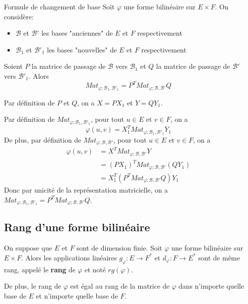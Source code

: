 \documentclass[a4paper,12pt]{article}
\begin{document}
\begin{theoreme}{Formule de changement de base}{}
    Soit $\varphi$ une forme bilinéaire sur $E \times F$.
    On considère:
    \begin{itemize}
        \item $\mathscr{B}$ et $\mathscr{B'}$ les bases "anciennes" de $E$ et $F$ respectivement
        \item $\mathscr{B}_1$ et $\mathscr{B'}_1$ les bases "nouvelles" de $E$ et $F$ respectivement
    \end{itemize}
    Soient $P$ la matrice de passage de $\mathscr{B}$ vers $\mathscr{B}_1$ et $Q$ la matrice de passage de $\mathscr{B'}$ vers $\mathscr{B'}_1$. Alors
    $$
    Mat_{\varphi; \mathscr{B}_1, \mathscr{B'}_1} = P^T Mat_{\varphi; \mathscr{B}, \mathscr{B'}} Q
    $$
\end{theoreme}

\begin{demonstration}
    Par définition de $P$ et $Q$, on a $X = P X_1$ et $Y = Q Y_1$.

    Par définition de $Mat_{\varphi; \mathscr{B}_1, \mathscr{B'}_1}$, pour tout $u \in E$ et $v \in F$, on a
    $$
    \varphi(u, v) = X_1^T Mat_{\varphi; \mathscr{B}_1, \mathscr{B'}_1} Y_1
    $$
    De plus, par définition de $Mat_{\varphi; \mathscr{B}, \mathscr{B'}}$, pour tout $u \in E$ et $v \in F$, on a
    \begin{align*}
    \varphi(u, v) &= X^T Mat_{\varphi; \mathscr{B}, \mathscr{B'}} Y \\
    &= (P X_1)^T Mat_{\varphi; \mathscr{B}, \mathscr{B'}} (Q Y_1) \\
    &= X_1^T \left( P^T Mat_{\varphi; \mathscr{B}, \mathscr{B'}} Q \right) Y_1
    \end{align*}
    Donc par unicité de la représentation matricielle, on a $Mat_{\varphi; \mathscr{B}_1, \mathscr{B'}_1} = P^T Mat_{\varphi; \mathscr{B}, \mathscr{B'}} Q$.
\end{demonstration}

\subsection{Rang d'une forme bilinéaire}

\begin{definition}
    On suppose que $E$ et $F$ sont de dimension finie. Soit $\varphi$ une forme bilinéaire sur $E \times F$. 
    Alors les applications linéaires $g_\varphi: E \to F^*$ et $d_\varphi: F \to E^*$ sont de même rang, appelé le \textbf{rang} de $\varphi$ et noté $rg(\varphi)$.

    De plus, le rang de $\varphi$ est égal au rang de la matrice de $\varphi$ dans n'importe quelle base de $E$ et n'importe quelle base de $F$.
\end{definition}
\end{document}
